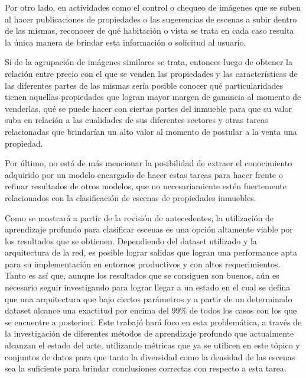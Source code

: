 Por otro lado, en actividades como el control o chequeo de imágenes que se suben al hacer publicaciones de propiedades o las sugerencias de escenas a subir dentro de las mismas, reconocer de qué habitación o vista se trata en cada caso resulta la única manera de brindar esta información o solicitud al usuario.

Si de la agrupación de imágenes similares se trata, entonces luego de obtener la relación entre precio con el que se venden las propiedades y las características de las diferentes partes de las mismas sería posible conocer qué particularidades tienen aquellas propiedades que logran mayor margen de ganancia al momento de venderlas, qué se puede hacer con ciertas partes del inmueble para que su valor suba en relación a las cualidades de sus diferentes sectores y otras tareas relacionadas que brindarían un alto valor al momento de postular a la venta una propiedad.

Por último, no está de más mencionar la posibilidad de extraer el conocimiento adquirido por un modelo encargado de hacer estas tareas para hacer frente o refinar resultados de otros modelos, que no necesariamiente estén fuertemente relacionados con la clasificación de escenas de propiedades inmuebles.

Como se mostrará a partir de la revisión de antecedentes, la utilización de aprendizaje profundo para clasificar escenas es una opción altamente viable por los resultados que se obtienen. Dependiendo del dataset utilizado y la arquitectura de la red, es posible lograr salidas que logran una performance apta para su implementación en entornos productivos y con altos requerimientos. Tanto es así que, aunque los resultados que se consiguen son buenos, aún es necesario seguir investigando para lograr llegar a un estado en el cual se defina que una arquitectura que bajo ciertos parámetros y a partir de un determinado dataset alcance una exactitud por encima del 99\% de todos los casos con los que se encuentre a posteriori. Este trabajó hará foco en esta problemática, a través de la investigación de diferentes métodos de aprendizaje profundo que actualmente alcanzan el estado del arte, utilizando métricas que ya se utilicen en este tópico y conjuntos de datos para que tanto la diversidad como la densidad de las escenas sea la suficiente para brindar conclusiones correctas con respecto a esta tarea.


